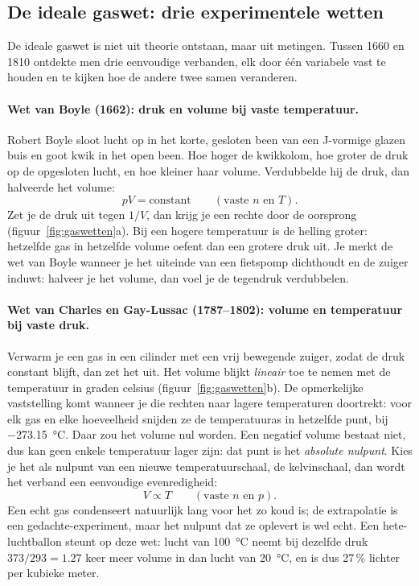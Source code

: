 \subsection{De ideale gaswet: drie experimentele wetten}
\label{sec:ideale-gaswet}

De ideale gaswet is niet uit theorie ontstaan, maar uit metingen. Tussen 1660 en 1810 ontdekte men drie eenvoudige verbanden, elk door \'e\'en variabele vast te houden en te kijken hoe de andere twee samen veranderen.

\paragraph{Wet van Boyle (1662): druk en volume bij vaste temperatuur.} Robert Boyle sloot lucht op in het korte, gesloten been van een J-vormige glazen buis en goot kwik in het open been. Hoe hoger de kwikkolom, hoe groter de druk op de opgesloten lucht, en hoe kleiner haar volume. Verdubbelde hij de druk, dan halveerde het volume:
\begin{equation}
pV = \text{constant} \qquad (\text{vaste } n \text{ en } T).
\end{equation}
Zet je de druk uit tegen $1/V$, dan krijg je een rechte door de oorsprong (figuur~\ref{fig:gaswetten}a). Bij een hogere temperatuur is de helling groter: hetzelfde gas in hetzelfde volume oefent dan een grotere druk uit. Je merkt de wet van Boyle wanneer je het uiteinde van een fietspomp dichthoudt en de zuiger induwt: halveer je het volume, dan voel je de tegendruk verdubbelen.

\paragraph{Wet van Charles en Gay-Lussac (1787--1802): volume en temperatuur bij vaste druk.} Verwarm je een gas in een cilinder met een vrij bewegende zuiger, zodat de druk constant blijft, dan zet het uit. Het volume blijkt \emph{lineair} toe te nemen met de temperatuur in graden celsius (figuur~\ref{fig:gaswetten}b). De opmerkelijke vaststelling komt wanneer je die rechten naar lagere temperaturen doortrekt: voor elk gas en elke hoeveelheid snijden ze de temperatuuras in hetzelfde punt, bij \SI{-273.15}{\celsius}. Daar zou het volume nul worden. Een negatief volume bestaat niet, dus kan geen enkele temperatuur lager zijn: dat punt is het \emph{absolute nulpunt}. Kies je het als nulpunt van een nieuwe temperatuurschaal, de kelvinschaal, dan wordt het verband een eenvoudige evenredigheid:
\begin{equation}
V \propto T \qquad (\text{vaste } n \text{ en } p).
\end{equation}
Een echt gas condenseert natuurlijk lang voor het zo koud is; de extrapolatie is een gedachte-experiment, maar het nulpunt dat ze oplevert is wel echt. Een hete-luchtballon steunt op deze wet: lucht van \SI{100}{\celsius} neemt bij dezelfde druk $373/293 = 1.27$ keer meer volume in dan lucht van \SI{20}{\celsius}, en is dus 27\,\% lichter per kubieke meter.

